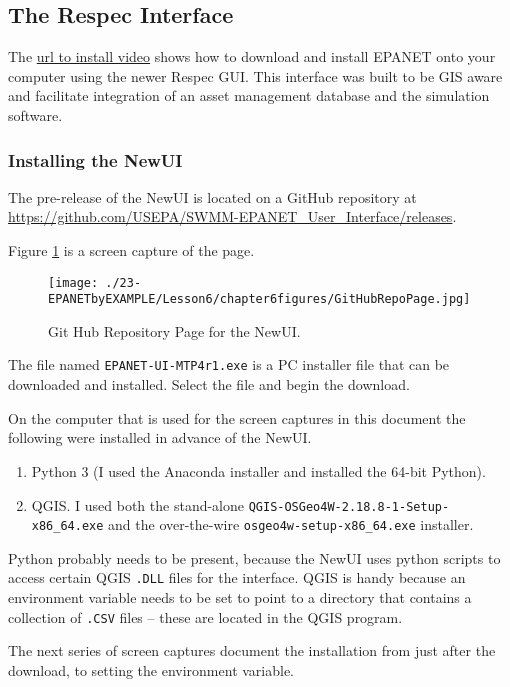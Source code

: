 \subsection{The Respec Interface}
The \url{url to install video} shows how to download and install EPANET onto your computer using the newer Respec GUI.  This interface was built to be GIS aware and facilitate integration of an asset management database and the simulation software.  

\subsubsection{Installing the NewUI}
The pre-release of the NewUI is located on a GitHub repository at
\url{https://github.com/USEPA/SWMM-EPANET_User_Interface/releases}.

Figure \ref{fig:GitHubRepoPage} is a screen capture of the page.
   
\begin{figure}[htbp] %
   \centering
   \texttt{[image: ./23-EPANETbyEXAMPLE/Lesson6/chapter6figures/GitHubRepoPage.jpg]} 
   \caption{Git Hub Repository Page for the NewUI.}
   \label{fig:GitHubRepoPage}
\end{figure}

The file named \texttt{EPANET-UI-MTP4r1.exe} is a PC installer file that can be downloaded and installed.   
Select the file and begin the download.

On the computer that is used for the screen captures in this document the following were installed in advance of the NewUI.
\begin{enumerate}
\item Python 3 (I used the Anaconda installer and installed the 64-bit Python).
\item QGIS.  I used both the stand-alone \texttt{QGIS-OSGeo4W-2.18.8-1-Setup-x86\_64.exe} and the over-the-wire \texttt{osgeo4w-setup-x86\_64.exe} installer.
\end{enumerate}

Python probably needs to be present, because the NewUI uses python scripts to access certain QGIS \texttt{.DLL} files for the interface.
QGIS is handy because an environment variable needs to be set to point to a directory that contains a collection of \texttt{.CSV} files -- these are located in the QGIS program.

The next series of screen captures document the installation from just after the download, to setting the environment variable.


